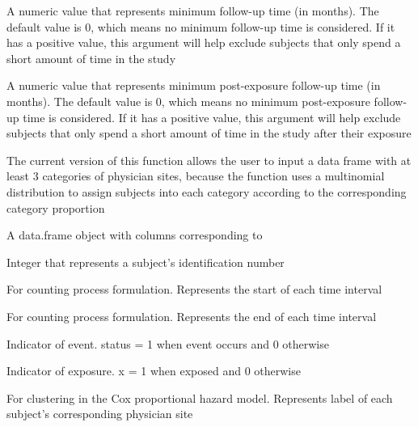 \documentclass[a4paper]{book}
\begin{document}
\begin{Arguments}
\begin{ldescription}
\item[\code{min.futime}] 
A numeric value that represents minimum follow-up time (in months). The default value is 0, which means no minimum follow-up time is considered. If it has a positive value, this argument will help exclude subjects that only spend a short amount of time in the study

\item[\code{min.postexp.futime}] A numeric value that represents minimum post-exposure follow-up time (in months). The default value is 0, which means no minimum post-exposure follow-up time is considered. If it has a positive value, this argument will help exclude subjects that only spend a short amount of time in the study after their exposure

\end{ldescription}
\end{Arguments}
%
\begin{Details}\relax

The current version of this function allows the user to input a data frame with at
least 3 categories of physician sites, because the function uses a multinomial
distribution to assign subjects into each category according to the corresponding category proportion
\end{Details}
%
\begin{Value}
A data.frame object with columns corresponding to
\begin{ldescription}
\item[\code{id}] 
Integer that represents a subject's identification number

\item[\code{start}] 
For counting process formulation. Represents the start of each time interval

\item[\code{stop}] 
For counting process formulation. Represents the end of each time interval

\item[\code{status}] 
Indicator of event. status = 1 when event occurs and 0 otherwise

\item[\code{x}] 
Indicator of exposure. x = 1 when exposed and 0 otherwise

\item[\code{clst\_id}] 
For clustering in the Cox proportional hazard model. Represents label of each subject's corresponding physician site

\end{ldescription}
\end{Value}
\end{document}
